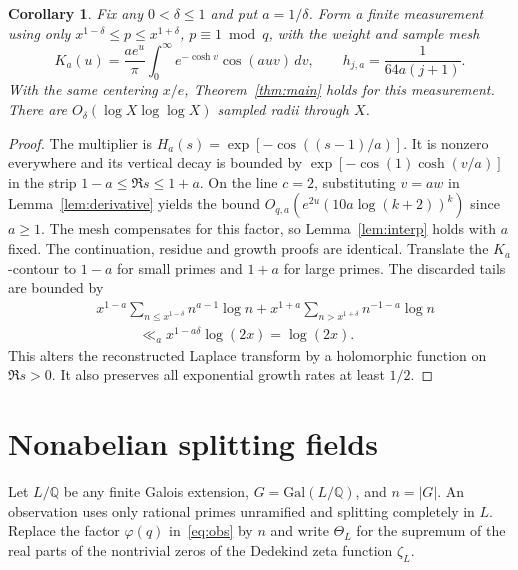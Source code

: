 \documentclass[11pt]{article}
\newtheorem{corollary}[theorem]{Corollary}
\begin{document}
\begin{corollary}\label{cor:finite}
Fix any $0<\delta\le1$ and put $a=1/\delta$. Form a finite measurement using only $x^{1-\delta}\le p\le x^{1+\delta}$, $p\equiv1\bmod q$, with the weight and sample mesh
\[
 K_a(u)=\frac{a e^u}{\pi}\int_0^\infty e^{-\cosh v}\cos(auv)\,dv,
 \qquad h_{j,a}=\frac1{64a(j+1)} .
\]
With the same centering $x/e$, Theorem~\ref{thm:main} holds for this measurement. There are $O_\delta(\log X\log\log X)$ sampled radii through $X$.
\end{corollary}
\begin{proof}
The multiplier is $H_a(s)=\exp[-\cos((s-1)/a)]$. It is nonzero everywhere and its vertical decay is bounded by $\exp[-\cos(1)\cosh(v/a)]$ in the strip $1-a\le\Re s\le1+a$. On the line $c=2$, substituting $v=aw$ in Lemma~\ref{lem:derivative} yields the bound $O_{q,a}(e^{2u}(10a\log(k+2))^k)$ since $a\ge1$. The mesh compensates for this factor, so Lemma~\ref{lem:interp} holds with $a$ fixed. The continuation, residue and growth proofs are identical. Translate the $K_a$-contour to $1-a$ for small primes and $1+a$ for large primes. The discarded tails are bounded by
\begin{align*}
 &x^{1-a}\sum_{n\le x^{1-\delta}}n^{a-1}\log n
 +x^{1+a}\sum_{n>x^{1+\delta}}n^{-1-a}\log n\\
 &\hspace{3em}\ll_a x^{1-a\delta}\log(2x)=\log(2x).
\end{align*}
This alters the reconstructed Laplace transform by a holomorphic function on $\Re s>0$. It also preserves all exponential growth rates at least $1/2$.
\end{proof}

\section{Nonabelian splitting fields}

Let $L/\mathbb Q$ be any finite Galois extension, $G=\mathrm{Gal}(L/\mathbb Q)$, and $n=|G|$. An observation uses only rational primes unramified and splitting completely in $L$. Replace the factor $\varphi(q)$ in~\eqref{eq:obs} by $n$ and write $\Theta_L$ for the supremum of the real parts of the nontrivial zeros of the Dedekind zeta function $\zeta_L$.
\end{document}
